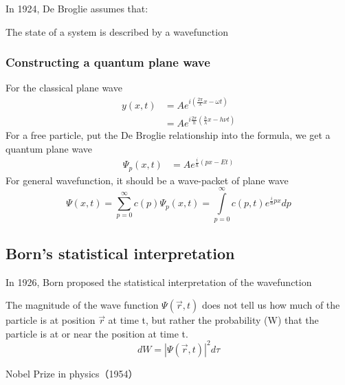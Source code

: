 \begin{frame}
    In 1924, De Broglie assumes that:\\
    \begin{tcolorbox}[colback=yellow!10,colframe=red!75!black,title=Basic assumption 1/5]
    The state of a system is described by a wavefunction
    \end{tcolorbox}
\end{frame}

\begin{frame}
    \frametitle{Constructing a quantum plane wave}
        For the classical plane wave
        \begin{equation*}
            \begin{split}
                y(x,t)&=A e^{i(\frac{2\pi}{\lambda}x-\omega t)} \\
                    & = A e^{i\frac{2\pi}{h}(\frac{h}{\lambda}x-h\nu t)}
            \end{split} 
        \end{equation*}
        For a free particle, put the De Broglie relationship into the formula, we get a quantum plane wave
        \begin{equation*}
            \begin{split}
                \Psi_p(x,t)&=A e^{\frac{i}{\hbar}(px-Et)}
            \end{split} 
         \end{equation*}
         For general wavefunction, it should be a wave-packet of plane wave
         \begin{equation*}
                \Psi(x,t)=\sum\limits_{p=0} ^{\infty} c(p)\Psi_p(x,t) = \int\limits_{p=0} ^{\infty} c(p,t) e^{\frac{i}{\hbar}px}dp
         \end{equation*}
\end{frame}

\subsection{Born's statistical interpretation}

\begin{frame}
    In 1926, Born proposed the statistical interpretation of the wavefunction
    \begin{tcolorbox}[colback=yellow!10,colframe=red!75!black,title=]
        The magnitude of the wave function $\Psi(\vec{r},t)$ does not tell us how much of 
        the particle is at position $\vec{r}$ at time t, 
        but rather the probability (W) that the particle is at or near the position at time t. \\
        \[ d W = |\Psi(\vec{r},t)|^2 d \tau \]
    \end{tcolorbox}
    {\color{deepred} Nobel Prize in physics（1954）}
\end{frame}

